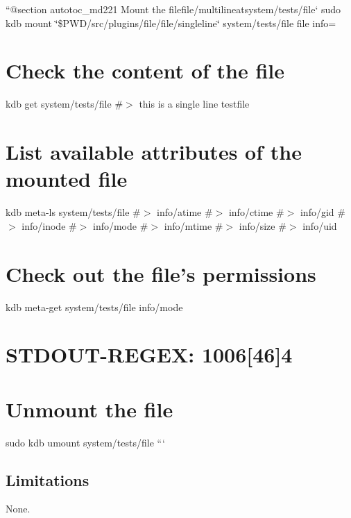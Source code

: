 ``{\ttfamily  @section autotoc\+\_\+md221 Mount the file}file/multiline{\ttfamily at}system/tests/file` sudo kdb mount \char`\"{}\$\+P\+W\+D/src/plugins/file/file/singleline\char`\"{} system/tests/file file info=\hypertarget{autotoc_md216_autotoc_md222}{}\section{Check the content of the file}\label{autotoc_md216_autotoc_md222}
kdb get system/tests/file \#$>$ this is a single line testfile\hypertarget{autotoc_md216_autotoc_md223}{}\section{List available attributes of the mounted file}\label{autotoc_md216_autotoc_md223}
kdb meta-\/ls system/tests/file \#$>$ info/atime \#$>$ info/ctime \#$>$ info/gid \#$>$ info/inode \#$>$ info/mode \#$>$ info/mtime \#$>$ info/size \#$>$ info/uid\hypertarget{autotoc_md216_autotoc_md224}{}\section{Check out the file’s permissions}\label{autotoc_md216_autotoc_md224}
kdb meta-\/get system/tests/file info/mode \hypertarget{autotoc_md216_autotoc_md225}{}\section{S\+T\+D\+O\+U\+T-\/\+R\+E\+G\+E\+X\+: 1006\mbox{[}46\mbox{]}4}\label{autotoc_md216_autotoc_md225}
\hypertarget{autotoc_md216_autotoc_md226}{}\section{Unmount the file}\label{autotoc_md216_autotoc_md226}
sudo kdb umount system/tests/file ```\hypertarget{autotoc_md216_autotoc_md227}{}\subsection{Limitations}\label{autotoc_md216_autotoc_md227}
None. 